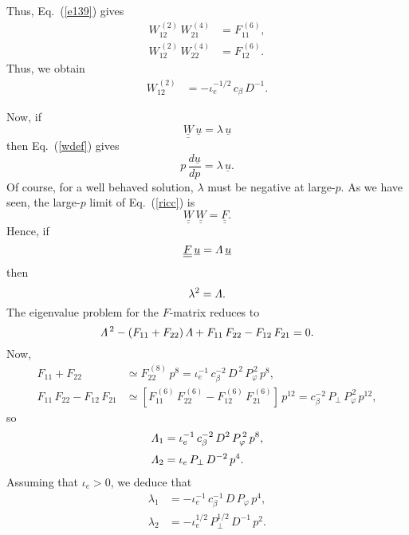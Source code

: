 \documentclass[12pt,prb,aps,notitlepage]{revtex4-1}
\begin{document}
Thus, Eq.~(\ref{e139}) gives 
\begin{align}
W_{12}^{\,(2)}\,W_{21}^{\,(4)} &= F_{11}^{\,(6)},\\[0.5ex]
W_{12}^{\,(2)}\,W_{22}^{\,(4)} &= F_{12}^{\,(6)}.
\end{align}
Thus, we obtain
\begin{align}
W_{12}^{\,(2)} &= - \iota_e^{-1/2}\,c_\beta\,D^{-1}.
\end{align}

Now, if
\begin{equation}
\underline{\underline{W}}\,\underline{u}= \lambda\,\underline{u}
\end{equation}
then Eq.~(\ref{wdef}) gives
\begin{equation}
p\,\frac{d\underline{u}}{dp} = \lambda\,\underline{u}.
\end{equation}
Of course, for a well behaved solution, $\lambda$ must be negative at large-$p$. As we have seen, the large-$p$ limit of
Eq.~(\ref{ricc}) is
\begin{equation}
\underline{\underline{W}}\,\underline{\underline{W}} = \underline{\underline{F}}.
\end{equation}
Hence, if
\begin{equation}
 \underline{\underline{F}}\,\underline{u} = {\mit\Lambda}\,\underline{u}
 \end{equation}
 then 
 \begin{equation}
 \lambda^2 = {\mit\Lambda}.
 \end{equation}
 The eigenvalue problem for the $F$-matrix reduces to
 \begin{equation}
 {\mit\Lambda}^{\,2}- (F_{11}+ F_{22})\,{\mit\Lambda} + F_{11}\,F_{22} - F_{12}\,F_{21}=0.
 \end{equation}
 Now,
 \begin{align}
 F_{11}+F_{22}&\simeq  F_{22}^{\,(8)}\,p^8 = \iota_e^{-1}\, c_\beta^{-2}\,D^{\,2}\,P_\varphi^{\,2}\,p^8,\\[0.5ex]
 F_{11}\,F_{22} - F_{12}\,F_{21}&  \simeq [F_{11}^{\,(6)}\,F_{22}^{\,(6)} - F_{12}^{\,(6)}\,F_{21}^{\,(6)}]\,p^{12}=c_\beta^{-2}\,P_\perp \,P_\varphi^{\,2}\,p^{12},
 \end{align}
 so
 \begin{align}
 {\mit\Lambda}_1&= \iota_e^{-1}\,c_\beta^{-2}\,D^2\,P_\varphi^{\,2}\,p^8,\\[0.5ex]
 {\mit\Lambda}_2 &= \iota_e\,P_\perp\,D^{-2} \,p^4.
 \end{align}
 Assuming that $\iota_e>0$, we deduce that
 \begin{align}
 \lambda_1&= -\iota_e^{-1}\,c_\beta^{-1}\,D\,P_\varphi\,p^4,\\[0.5ex]
 \lambda_2&=-\iota_e^{1/2}\,P_\perp^{1/2}\,D^{-1}\,p^2.
 \end{align}
\end{document}
